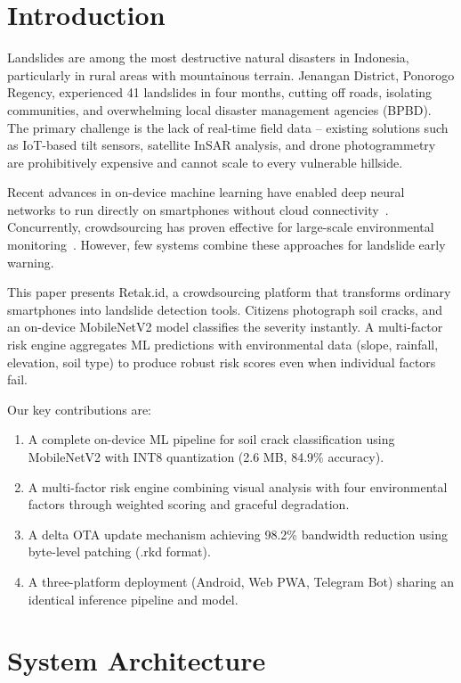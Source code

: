 \documentclass[conference]{IEEEtran}
\begin{document}
\section{Introduction}

Landslides are among the most destructive natural disasters in Indonesia, particularly in rural areas with mountainous terrain. Jenangan District, Ponorogo Regency, experienced 41 landslides in four months, cutting off roads, isolating communities, and overwhelming local disaster management agencies (BPBD). The primary challenge is the lack of real-time field data -- existing solutions such as IoT-based tilt sensors, satellite InSAR analysis, and drone photogrammetry are prohibitively expensive and cannot scale to every vulnerable hillside.

Recent advances in on-device machine learning have enabled deep neural networks to run directly on smartphones without cloud connectivity~\cite{howard2017mobilenets, tensorflow2015}. Concurrently, crowdsourcing has proven effective for large-scale environmental monitoring~\cite{goodchild2007citizen}. However, few systems combine these approaches for landslide early warning.

This paper presents Retak.id, a crowdsourcing platform that transforms ordinary smartphones into landslide detection tools. Citizens photograph soil cracks, and an on-device MobileNetV2 model classifies the severity instantly. A multi-factor risk engine aggregates ML predictions with environmental data (slope, rainfall, elevation, soil type) to produce robust risk scores even when individual factors fail.

Our key contributions are:
\begin{enumerate}
	\item A complete on-device ML pipeline for soil crack classification using MobileNetV2 with INT8 quantization (2.6 MB, 84.9\% accuracy).
	\item A multi-factor risk engine combining visual analysis with four environmental factors through weighted scoring and graceful degradation.
	\item A delta OTA update mechanism achieving 98.2\% bandwidth reduction using byte-level patching (.rkd format).
	\item A three-platform deployment (Android, Web PWA, Telegram Bot) sharing an identical inference pipeline and model.
\end{enumerate}

\section{System Architecture}
\end{document}
